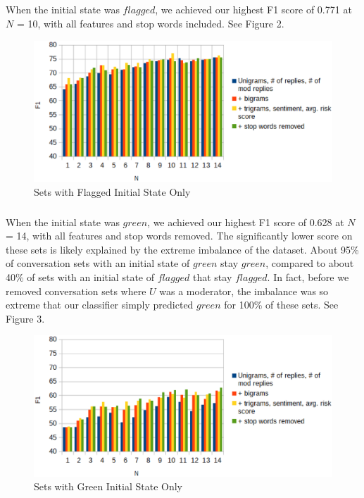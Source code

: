 \documentclass{article}
\begin{document}
\subparagraph{}When the initial state was $flagged$, we achieved our highest F1 score of 0.771 at $N$ = 10, with all features and stop words included. See Figure 2.

\begin{figure}[h!]
    \includegraphics[width=14cm]{resultsFlagged}
    \caption{Sets with Flagged Initial State Only}
\end{figure}

\subparagraph{}When the initial state was $green$, we achieved our highest F1 score of 0.628 at $N$ = 14, with all features and stop words removed. The significantly lower score on these sets is likely explained by the extreme imbalance of the dataset. About 95\% of conversation sets with an initial state of $green$ stay $green$, compared to about 40\% of sets with an initial state of $flagged$ that stay $flagged$. In fact, before we removed conversation sets where $U$ was a moderator, the imbalance was so extreme that our classifier simply predicted $green$ for 100\% of these sets. See Figure 3.

\begin{figure}[h!]
    \includegraphics[width=14cm]{resultsGreen}
    \caption{Sets with Green Initial State Only}
\end{figure}
\end{document}

